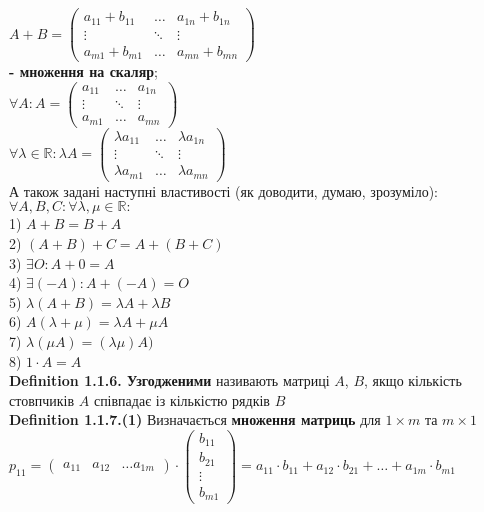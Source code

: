 \documentclass[a4paper, 14pt]{extarticle}
\def\defin#1{\textbf{Definition {#1}}}
\def\bigline{\vspace{5mm}\\}
\begin{document}
    	$A + B = \begin{pmatrix}
    	a_{11}+b_{11} & \dots & a_{1n} + b_{1n} \\
    	\vdots & \ddots & \vdots \\
    	a_{m1}+b_{m1} & \dots & a_{mn} + b_{mn}
    	\end{pmatrix}$
    	\bigline
    	\textbf{- множення на скаляр};\\
    	$\forall A: A = \begin{pmatrix}
    	a_{11} & \dots & a_{1n} \\
    	\vdots & \ddots & \vdots \\
    	a_{m1} & \dots & a_{mn}
    	\end{pmatrix}$\\
    	$\forall \lambda \in \mathbb{R}: \lambda A = \begin{pmatrix}
    	\lambda a_{11} & \dots & \lambda a_{1n} \\
    	\vdots & \ddots & \vdots \\
    	\lambda a_{m1} & \dots & \lambda a_{mn}
    	\end{pmatrix}$
    	\bigline
    	А також задані наступні властивості (як доводити, думаю, зрозуміло):\\
    	$\forall A,B,C: \forall \lambda,\mu \in \mathbb{R}:$\\
    	1) $A + B = B + A$\\
	2) $(A + B) + C = A + (B + C)$\\
	3) $\exists O: A + 0 = A$\\
	4) $\exists (-A): A + (-A) = O$\\
	5) $\lambda(A+B) = \lambda A + \lambda B$\\
	6) $A (\lambda + \mu) = \lambda A + \mu A$\\
	7) $\lambda (\mu A) = (\lambda \mu) A)$\\
	8) $1 \cdot A = A$
	\bigline
	\defin{1.1.6. Узгодженими} називають матриці $A$, $B$, якщо кількість стовпчиків $A$ співпадає із кількістю рядків $B$
	\bigline
	\defin{1.1.7.(1)} Визначається \textbf{множення матриць} для $1 \times m$ та $m \times 1$\\
	$p_{11} = \begin{pmatrix}
	a_{11} & a_{12} & \dots a_{1m}
	\end{pmatrix} \cdot \begin{pmatrix}
	b_{11} \\ b_{21} \\ \vdots \\ b_{m1} 
	\end{pmatrix} = a_{11} \cdot b_{11} + a_{12} \cdot b_{21} + \dots + a_{1m} \cdot b_{m1}$
\end{document}
